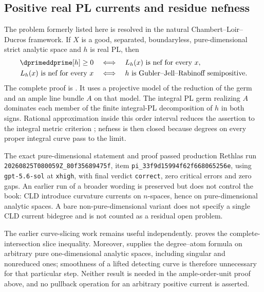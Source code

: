 \subsection{Positive real PL currents and residue nefness}
\label{sec:ch72-resolved-current-residue}

The problem formerly listed here is resolved in the natural
Chambert--Loir--Ducros framework.  If \(X\) is a good, separated,
boundaryless, pure-dimensional strict analytic space and \(h\) is real PL,
then
\[
\begin{aligned}
 \dprimeddprime[h]\geq0
 &\quad\Longleftrightarrow\quad
 L_h(x)\text{ is nef for every }x,\\
 L_h(x)\text{ is nef for every }x
 &\quad\Longleftrightarrow\quad
 h\text{ is Gubler--Jell--Rabinoff semipositive}.
\end{aligned}
\]
The complete proof is .
It uses a projective model of the reduction of the germ and an ample line
bundle \(A\) on that model.  The integral PL germ realizing \(A\) dominates
each member of the finite integral-PL decomposition of \(h\) in both signs.
Rational approximation inside this order interval reduces the assertion to
the integral metric criterion \cite[Corollary~18.8.8]{CLD25}; nefness is
then closed because degrees on every proper integral curve pass to the
limit.

The exact pure-dimensional statement and proof passed production Rethlas
run \nolinkurl{20260825T080059Z_80f35689475f}, item
\nolinkurl{pi_33f9d15994f62f668065256e}, using
\texttt{gpt-5.6-sol} at \texttt{xhigh}, with final verdict
\texttt{correct}, zero critical errors and zero gaps.  An earlier run of a
broader wording is preserved but does not control the book: CLD introduce
curvature currents on \(n\)-spaces, hence on pure-dimensional analytic
spaces.  A bare non-pure-dimensional variant does not specify a single CLD
current bidegree and is not counted as a residual open problem.

The earlier curve-slicing work remains useful independently.
 proves the complete-intersection
slice inequality.  Moreover, \cite[Theorem~18.4.7]{CLD25} supplies the
degree--atom formula on arbitrary pure one-dimensional analytic spaces,
including singular and nonreduced ones; smoothness of a lifted detecting
curve is therefore unnecessary for that particular step.  Neither result
is needed in the ample-order-unit proof above, and no pullback operation for
an arbitrary positive current is asserted.

